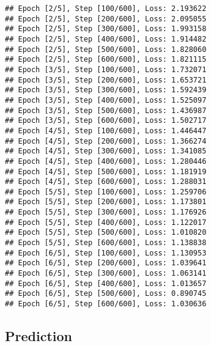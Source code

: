 \documentclass[]{book}
\begin{document}
\begin{verbatim}
## Epoch [2/5], Step [100/600], Loss: 2.193622 
## Epoch [2/5], Step [200/600], Loss: 2.095055 
## Epoch [2/5], Step [300/600], Loss: 1.993158 
## Epoch [2/5], Step [400/600], Loss: 1.914482 
## Epoch [2/5], Step [500/600], Loss: 1.828060 
## Epoch [2/5], Step [600/600], Loss: 1.821115 
## Epoch [3/5], Step [100/600], Loss: 1.732071 
## Epoch [3/5], Step [200/600], Loss: 1.653721 
## Epoch [3/5], Step [300/600], Loss: 1.592439 
## Epoch [3/5], Step [400/600], Loss: 1.525097 
## Epoch [3/5], Step [500/600], Loss: 1.436987 
## Epoch [3/5], Step [600/600], Loss: 1.502717 
## Epoch [4/5], Step [100/600], Loss: 1.446447 
## Epoch [4/5], Step [200/600], Loss: 1.366274 
## Epoch [4/5], Step [300/600], Loss: 1.341085 
## Epoch [4/5], Step [400/600], Loss: 1.280446 
## Epoch [4/5], Step [500/600], Loss: 1.181919 
## Epoch [4/5], Step [600/600], Loss: 1.288031 
## Epoch [5/5], Step [100/600], Loss: 1.259706 
## Epoch [5/5], Step [200/600], Loss: 1.173801 
## Epoch [5/5], Step [300/600], Loss: 1.176926 
## Epoch [5/5], Step [400/600], Loss: 1.122017 
## Epoch [5/5], Step [500/600], Loss: 1.010820 
## Epoch [5/5], Step [600/600], Loss: 1.138838 
## Epoch [6/5], Step [100/600], Loss: 1.130953 
## Epoch [6/5], Step [200/600], Loss: 1.039641 
## Epoch [6/5], Step [300/600], Loss: 1.063141 
## Epoch [6/5], Step [400/600], Loss: 1.013657 
## Epoch [6/5], Step [500/600], Loss: 0.890745 
## Epoch [6/5], Step [600/600], Loss: 1.030636
\end{verbatim}

\hypertarget{prediction}{%
\subsection{Prediction}\label{prediction}}
\end{document}
